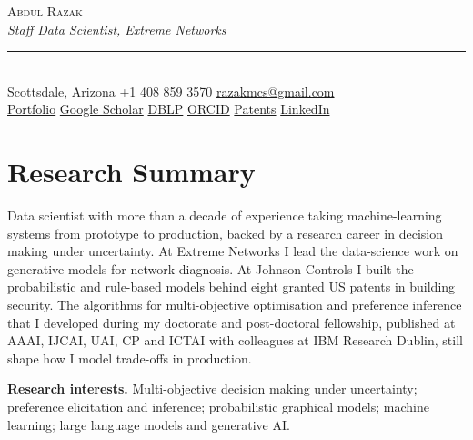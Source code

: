 \documentclass[9pt,letterpaper]{extarticle}
\newcommand{\lnk}[2]{\href{#1}{\textcolor{linklight}{#2}}}
\begin{document}
\begin{tcolorbox}[
  colback=band, colframe=band, boxrule=0pt, arc=3pt,
  left=14pt, right=14pt, top=7pt, bottom=6pt, halign=center]
  {\color{white}\fontsize{21}{23}\selectfont\scshape Abdul Razak}\\[3pt]
  {\color{linklight}\normalsize\itshape Staff Data Scientist, Extreme Networks}\\[5pt]
  {\color{white!45!band}\rule{0.94\linewidth}{0.5pt}}\\[5pt]
  {\small\color{white}
   Scottsdale, Arizona \quad\textbar\quad
   +1 408 859 3570 \quad\textbar\quad
   \lnk{mailto:razakmcs@gmail.com}{razakmcs@gmail.com}}\\[3pt]
  {\small\color{white}
   \lnk{https://abdulrazakucc.github.io/}{Portfolio} \quad\textbar\quad
   \lnk{https://scholar.google.com/citations?user=NeuA3uAAAAAJ\&hl=en}{Google Scholar} \quad\textbar\quad
   \lnk{https://dblp.org/pid/120/1333.html}{DBLP} \quad\textbar\quad
   \lnk{https://orcid.org/0009-0004-6819-147X}{ORCID} \quad\textbar\quad
   \lnk{https://patents.justia.com/inventor/abdul-razak}{Patents} \quad\textbar\quad
   \lnk{https://www.linkedin.com/in/data-analytics/}{LinkedIn}}
\end{tcolorbox}

\section{Research Summary}

Data scientist with more than a decade of experience taking machine-learning systems from
prototype to production, backed by a research career in decision making under uncertainty. At
Extreme Networks I lead the data-science work on generative models for network diagnosis. At
Johnson Controls I built the probabilistic and rule-based models behind eight granted US patents in
building security. The algorithms for multi-objective optimisation and preference inference that I
developed during my doctorate and post-doctoral fellowship, published at AAAI, IJCAI, UAI, CP and
ICTAI with colleagues at IBM Research Dublin, still shape how I model trade-offs in production.

\vspace{4pt}
\begin{tcolorbox}[colback=panel, colframe=rule, boxrule=0.4pt, arc=2pt,
                  left=9pt, right=9pt, top=5pt, bottom=5pt]
  {\small\bfseries\color{accent}Research interests.}\;
  Multi-objective decision making under uncertainty; preference elicitation and inference;
  probabilistic graphical models; machine learning; large language models and generative AI.
\end{tcolorbox}
\end{document}
